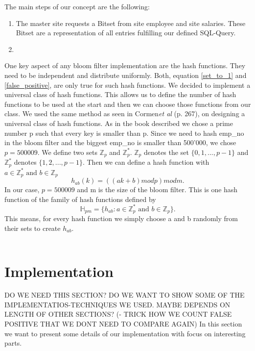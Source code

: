 \documentclass[12]{scrartcl}
\begin{document}
The main steps of our concept are the following:
\begin{enumerate}
	\item The master site requests a Bitset from site employee and site salaries. These Bitset are a representation of all entries fulfilling our defined SQL-Query.
	\item 
\end{enumerate}



One key aspect of any bloom filter implementation are the hash functions. They need to be independent and distribute uniformly. Both, equation \ref{set_to_1} and \ref{false_positive}, are only true for such hash functions. We decided to implement a universal class of hash functions. This allows us to define the number of hash functions to be used at the start and then we can choose those functions from our class. We used the same method as seen in Cormen{\em et al}\cite{cormen} (p. 267), on designing a universal class of hash functions. As in the book described we chose a prime number p such that every key is smaller than p. Since we need to hash emp\_no in the bloom filter and the biggest emp\_no is smaller than 500'000, we chose $p = 500009$. We define two sets $\mathbb{Z}_p$ and $\mathbb{Z}_p^*$. $\mathbb{Z}_p$ denotes the set $\{0,1,...,p-1\}$ and $\mathbb{Z}_p^*$ denotes $\{1,2,...,p-1\}$. Then we can define a hash function with $a \in \mathbb{Z}_p^* \text{ and } b \in \mathbb{Z}_p$
\begin{equation}
	h_{ab}(k) = ((ak + b) \mathrel{mod} p) \mathrel{mod} m.
\end{equation}
In our case, $p = 500009$ and m is the size of the bloom filter. This is one hash function of the family of hash functions defined by
\begin{equation}
\mathbb{H}_{pm} = \{h_{ab} \mathrel{:} a \in \mathbb{Z}_p^* \text{ and } b \in \mathbb{Z}_p\}.
\end{equation}
This means, for every hash function we simply choose a and b randomly from their sets to create $h_{ab}$.\\\\

\section{Implementation}
DO WE NEED THIS SECTION? DO WE WANT TO SHOW SOME OF THE IMPLEMENTATIOS-TECHNIQUES WE USED. MAYBE DEPENDS ON LENGTH OF OTHER SECTIONS? (- TRICK HOW WE COUNT FALSE POSITIVE THAT WE DONT NEED TO COMPARE AGAIN)
In this section we want to present some details of our implementation with focus on interesting parts.
\end{document}
